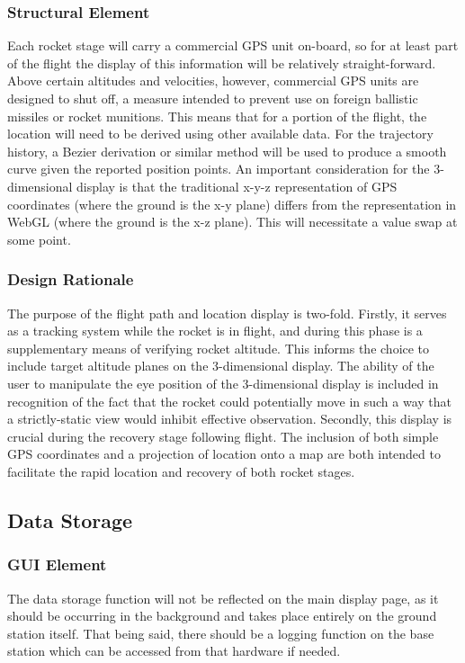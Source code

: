 \documentclass[journal,10pt,onecolumn,compsoc]{IEEEtran}
\begin{document}
		\subsubsection{Structural Element}
			Each rocket stage will carry a commercial GPS unit on-board, so for at least part of the flight the display of this information will be relatively straight-forward.
			Above certain altitudes and velocities, however, commercial GPS units are designed to shut off, a measure intended to prevent use on foreign ballistic missiles or rocket munitions.
			This means that for a portion of the flight, the location will need to be derived using other available data.
			For the trajectory history, a Bezier derivation or similar method will be used to produce a smooth curve given the reported position points.
			An important consideration for the 3-dimensional display is that the traditional x-y-z representation of GPS coordinates (where the ground is the x-y plane) differs from the representation in WebGL (where the ground is the x-z plane).
			This will necessitate a value swap at some point.

		\subsubsection{Design Rationale}
			The purpose of the flight path and location display is two-fold.
			Firstly, it serves as a tracking system while the rocket is in flight, and during this phase is a supplementary means of verifying rocket altitude.
			This informs the choice to include target altitude planes on the 3-dimensional display.
			The ability of the user to manipulate the eye position of the 3-dimensional display is included in recognition of the fact that the rocket could potentially move in such a way that a strictly-static view would inhibit effective observation.
			Secondly, this display is crucial during the recovery stage following flight.
			The inclusion of both simple GPS coordinates and a projection of location onto a map are both intended to facilitate the rapid location and recovery of both rocket stages.

	\subsection{Data Storage}

		\subsubsection{GUI Element}
			The data storage function will not be reflected on the main display page, as it should be occurring in the background and takes place entirely on the ground station itself.
			That being said, there should be a logging function on the base station which can be accessed from that hardware if needed.
\end{document}
